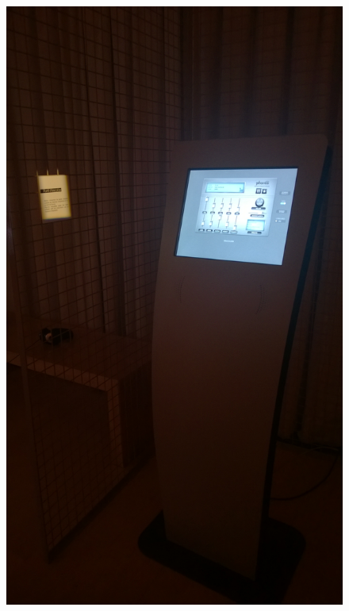 \begin{figure}[htbp]
\begin{center}
\includegraphics[scale=0.1]{Figures/kiosk1.jpg}

\vspace{1cm}


\end{center}
\end{figure}
